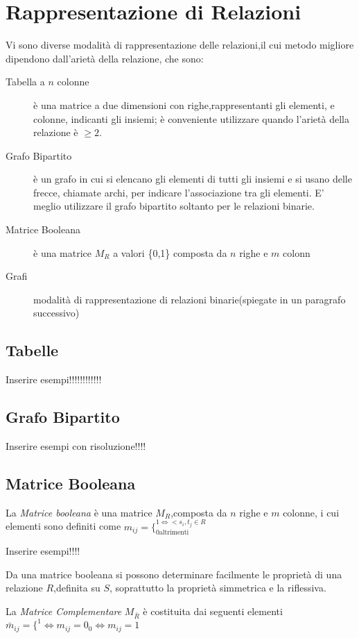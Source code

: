 \section{Rappresentazione di Relazioni}
Vi sono diverse modalità di rappresentazione delle relazioni,il cui metodo migliore
dipendono dall'arietà della relazione, che sono:
\begin{description}
    \item[Tabella a $n$ colonne] è una matrice a due dimensioni con righe,rappresentanti
          gli elementi, e colonne, indicanti gli insiemi; è conveniente utilizzare
          quando l'arietà della relazione è $\geq 2$.
    \item[Grafo Bipartito] è un grafo in cui si elencano gli elementi di tutti gli insiemi
         e si usano delle frecce, chiamate archi, per indicare l'associazione tra gli elementi.
         E' meglio utilizzare il grafo bipartito soltanto per le relazioni binarie.
    \item[Matrice Booleana] è una matrice $M_R$ a valori \{0,1\} composta da $n$ righe e $m$ colonn
    \item[Grafi] modalità di rappresentazione di relazioni binarie(spiegate in un paragrafo successivo)
\end{description}

\subsection{Tabelle}
Inserire esempi!!!!!!!!!!!!

\subsection{Grafo Bipartito}
Inserire esempi con risoluzione!!!!

\subsection{Matrice Booleana}
La \emph{Matrice booleana} è una matrice $M_R$,composta da $n$ righe e $m$ colonne,
i cui elementi sono definiti come $m_{ij} = \{ ^{1 \iff <s_i,t_j \in R} _{0 \text{altrimenti}}$

Inserire esempi!!!!

Da una matrice booleana si possono determinare facilmente le proprietà
di una relazione $R$,definita su $S$, soprattutto la proprietà simmetrica e la riflessiva.

La \emph{Matrice Complementare} $M_{\bar{R}}$ è costituita dai seguenti elementi
$\bar{m}_{ij} = \{ ^ 1 \iff m_{ij} = 0 _ 0 \iff m_{ij} = 1$

